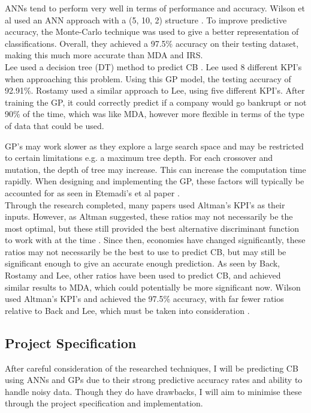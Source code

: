 \documentclass[11pt]{article}
\begin{document}
ANNs tend to perform very well in terms of performance and accuracy. Wilson et al used an ANN approach with a (5, 10, 2) structure \cite{?}. To improve predictive accuracy, the Monte-Carlo technique was used to give a better representation of classifications. Overall, they achieved a 97.5\% accuracy on their testing dataset, making this much more accurate than MDA and IRS. \\
Lee used a decision tree (DT) method to predict CB \cite{?}. Lee used 8 different KPI's when approaching this problem. Using this GP model, the testing accuracy of 92.91\%. Rostamy \cite{?} used a similar approach to Lee, using five different KPI's. After training the GP, it could correctly predict if a company would go bankrupt or not 90\% of the time, which was like MDA, however more flexible in terms of the type of data that could be used.

GP's may work slower as they explore a large search space and may be restricted to certain limitations e.g. a maximum tree depth. For each crossover and mutation, the depth of tree may increase. This can increase the computation time rapidly. When designing and implementing the GP, these factors will typically be accounted for as seen in Etemadi's et al paper \cite{?}. \\

Through the research completed, many papers used Altman's KPI's as their inputs. However, as Altman suggested, these ratios may not necessarily be the most optimal, but these still provided the best alternative discriminant function to work with at the time \cite{?}. Since then, economies have changed significantly, these ratios may not necessarily be the best to use to predict CB, but may still be significant enough to give an accurate enough prediction. As seen by Back, Rostamy and Lee\cite{'''}, other ratios have been used to predict CB, and achieved similar results to MDA, which could potentially be more significant now. Wilson used Altman's KPI's and achieved the 97.5\% accuracy, with far fewer ratios relative to Back and Lee, which must be taken into consideration \cite{?}.
\subsection{Project Specification}
After careful consideration of the researched techniques, I will be predicting CB using ANNs and GPs due to their strong predictive accuracy rates and ability to handle noisy data. Though they do have drawbacks, I will aim to minimise these through the project specification and implementation.\\
\end{document}
